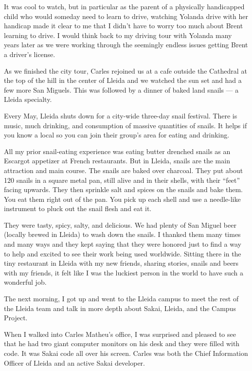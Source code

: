 \documentclass[12pt]{book}
\begin{document}
It was cool to watch, but in particular as the parent of a physically
handicapped child who would someday need to learn to drive, watching
Yolanda drive with her handicap made it clear to me that I didn't
have to worry too much about Brent learning to drive.  I would think back to
my driving tour with Yolanda many years later as we were working
through the seemingly endless issues getting Brent a driver's license.

As we finished the city tour, Carles rejoined us at a cafe outside
the Cathedral at the top of the hill in the center of Lleida and we
watched the sun set and had a few more San Miguels.  This was followed
by a dinner of baked land snails ---
a Lleida specialty.

Every May, Lleida shuts down for a city-wide
three-day snail festival.  There is music, much drinking,
and consumption of massive quantities of snails.  It helps
if you know a local so you can join their group's area for
eating and drinking.

All my prior snail-eating experience
was eating butter drenched snails as an Escargot appetizer at French
restaurants.   But in Lleida, snails are the main
attraction and main course.  The snails are baked over charcoal.
They put about 120 snails in a square metal pan, still alive
and in their shells, with their ``feet'' facing upwards.
They then sprinkle salt and spices on the snails and bake them.
You eat them right out of the pan.  You pick up each shell and
use a needle-like instrument to pluck out the snail flesh and
eat it.

They were tasty, spicy, salty, and delicious.
We had plenty of San Miguel beer (locally brewed in Lleida)
to wash down the snails.  I thanked them many times
and many ways and they kept saying that they were honored
just to find a way to help and excited to see their work
being used worldwide.  Sitting there in the tiny restaurant
in Lleida with my new friends, sharing stories,
snails and beers with my friends, it felt like I was the
luckiest person in the world to have such a wonderful job.

The next morning, I got up and went to the Lleida campus
to meet the rest of the Lleida team and talk in more depth
about Sakai, Lleida, and the Campus Project.

When I walked into Carles Matheu's office, I was
surprised and pleased to see that he had two giant computer
monitors on his desk and they were filled with code.
It was Sakai code all over his screen.  Carles was both the
Chief Information Officer of Lleida and an active Sakai developer.
\end{document}
